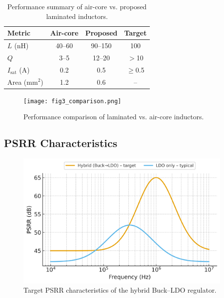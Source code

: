 \documentclass[journal]{IEEEtran}
\begin{document}
\begin{table}[t]
\caption{Performance summary of air-core vs. proposed laminated inductors.}
\centering
\begin{tabular}{@{}lccc@{}}
\toprule
Metric & Air-core & Proposed & Target \\
\midrule
$L$ (nH) & 40--60 & 90--150 & 100 \\
$Q$ & 3--5 & 12--20 & $>$10 \\
$I_\text{sat}$ (A) & 0.2 & 0.5 & $\geq$0.5 \\
Area (mm$^2$) & 1.2 & 0.6 & -- \\
\bottomrule
\end{tabular}
\label{tab:comparison}
\end{table}

\begin{figure}[t]
  \centering
  \texttt{[image: fig3\_comparison.png]}
  \caption{Performance comparison of laminated vs. air-core inductors.}
  \label{fig:comparison}
\end{figure}

\subsection{PSRR Characteristics}
\begin{figure}[t]
  \centering
  \includegraphics[width=0.95\textwidth]{fig4_psrr_target.png}
  \caption{Target PSRR characteristics of the hybrid Buck--LDO regulator.}
  \label{fig:psrr}
\end{figure}
\end{document}
